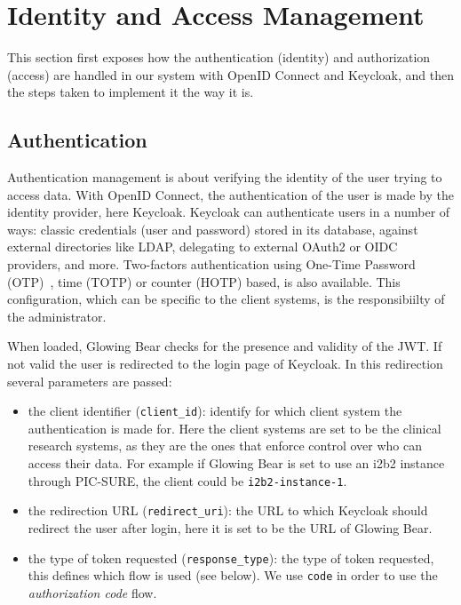 \section{Identity and Access Management}
\label{sec:interoplayer-idp}

This section first exposes how the authentication (identity) and authorization (access) are handled in our system with OpenID Connect and Keycloak, and then the steps taken to implement it the way it is.



\subsection{Authentication}

Authentication management is about verifying the identity of the user trying to access data.
With OpenID Connect, the authentication of the user is made by the identity provider, here Keycloak.
Keycloak can authenticate users in a number of ways: classic credentials (user and password) stored in its database, against external directories like LDAP, delegating to external OAuth2 or OIDC providers, and more.
Two-factors authentication using One-Time Password (OTP)~\cite{todo}, time (TOTP) or counter (HOTP) based, is also available.
This configuration, which can be specific to the client systems, is the responsibiilty of the administrator. 

When loaded, Glowing Bear checks for the presence and validity of the JWT. 
If not valid the user is redirected to the login page of Keycloak. 
In this redirection several parameters are passed:

\begin{itemize}
    \item the client identifier (\verb|client_id|): identify for which client system the authentication is made for.
    Here the client systems are set to be the clinical research systems, as they are the ones that enforce control over who can access their data. For example if Glowing Bear is set to use an i2b2 instance through PIC-SURE, the client could be \verb|i2b2-instance-1|.
    \item the redirection URL (\verb|redirect_uri|): the URL to which Keycloak should redirect the user after login, here it is set to be the URL of Glowing Bear.
    \item the type of token requested (\verb|response_type|): the type of token requested, this defines which flow is used (see below). We use \verb|code| in order to use the \emph{authorization code} flow.
\end{itemize}

